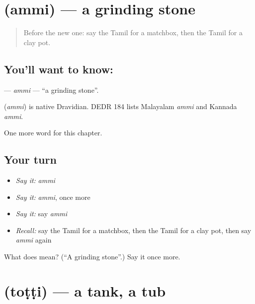 \section[\texorpdfstring{\ta{அம்மி} (ammi)}{அம்மி (ammi)}]{ (ammi) — a grinding stone}

\label{lesson:TA-C190-ammi}



\begin{quote}
Before the new one: say the Tamil for a matchbox, then the Tamil for a clay pot.
\end{quote}

\subsection*{You'll want to know: }
\textbf{} — \emph{ammi} — \textquotedblleft{}a grinding stone\textquotedblright{}.

\begin{cousinweb}
\textbf{} (\emph{ammi}) is native Dravidian. DEDR 184 lists Malayalam \emph{ammi} and Kannada \emph{ammi}.
\end{cousinweb}

\begin{grammarlens}[title={What you've built}]
One more word for this chapter.
\end{grammarlens}

\subsection*{Your turn}
\begin{itemize}
\raggedright
  \item \emph{Say it:} \emph{ammi}
  \item \emph{Say it:} \emph{ammi}, once more
  \item \emph{Say it:} say \emph{ammi}
  \item \emph{Recall:} say the Tamil for a matchbox, then the Tamil for a clay pot, then say \emph{ammi} again
\end{itemize}

\begin{tcolorbox}[breakable,colback=teal!4,colframe=teal!35!black,title={Before you move on}]
What does  mean? (\textquotedblleft{}A grinding stone\textquotedblright{}.) Say it once more.
\end{tcolorbox}
\section[\texorpdfstring{\ta{தொட்டி} (toṭṭi)}{தொட்டி (toṭṭi)}]{ (toṭṭi) — a tank, a tub}

